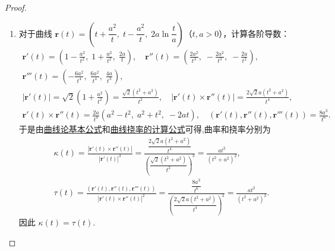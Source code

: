 \documentclass[../../main.tex]{subfiles}%
\begin{document}
\begin{proof}
\begin{enumerate}[(1)]
\item 对于曲线 $\bm{r}(t) = \left(t + \dfrac{a^2}{t},\; t - \dfrac{a^2}{t},\; 2a\ln\dfrac{t}{a}\right)$（$t,a>0$），计算各阶导数：
\begin{gather*}
\boldsymbol{r}'(t)=\left(1-\frac{a^2}{t^2},\;1+\frac{a^2}{t^2},\;\frac{2a}{t}\right),\quad
\boldsymbol{r}''(t)=\left(\frac{2a^2}{t^3},\;-\frac{2a^2}{t^3},\;-\frac{2a}{t^2}\right),\\
\boldsymbol{r}'''(t)=\left(-\frac{6a^2}{t^4},\;\frac{6a^2}{t^4},\;\frac{4a}{t^3}\right),\\
\left|\boldsymbol{r}'(t)\right|=\sqrt{2}\left(1+\frac{a^2}{t^2}\right)=\frac{\sqrt{2}(t^2+a^2)}{t^2},\quad
\left|\boldsymbol{r}'(t)\times\boldsymbol{r}''(t)\right|=\frac{2\sqrt{2}a(t^2+a^2)}{t^4},\\
\boldsymbol{r}'(t)\times\boldsymbol{r}''(t)=\frac{2a}{t^4}\left(a^2-t^2,\;a^2+t^2,\;-2at\right),\quad
(\boldsymbol{r}'(t),\boldsymbol{r}''(t),\boldsymbol{r}'''(t))=\frac{8a^3}{t^6}.
\end{gather*}
于是由\hyperref[theorem:曲线论基本公式]{曲线论基本公式}和\hyperref[theorem:微分几何-曲线挠率的计算公式]{曲线挠率的计算公式}可得,曲率和挠率分别为
\begin{gather*}
\kappa(t)=\frac{\left|\boldsymbol{r}'(t)\times\boldsymbol{r}''(t)\right|}{\left|\boldsymbol{r}'(t)\right|^3}
= \frac{\dfrac{2\sqrt{2}a(t^2+a^2)}{t^4}}{\left(\dfrac{\sqrt{2}(t^2+a^2)}{t^2}\right)^3}
= \frac{a t^2}{(t^2+a^2)^2},\\
\tau(t)=\frac{(\boldsymbol{r}'(t),\boldsymbol{r}''(t),\boldsymbol{r}'''(t))}{\left|\boldsymbol{r}'(t)\times\boldsymbol{r}''(t)\right|^2}
= \frac{\dfrac{8a^3}{t^6}}{\left(\dfrac{2\sqrt{2}a(t^2+a^2)}{t^4}\right)^2}
= \frac{a t^2}{(t^2+a^2)^2}.
\end{gather*}
因此 $\kappa(t)=\tau(t)$.
\end{enumerate}
\end{proof}
\end{document}
